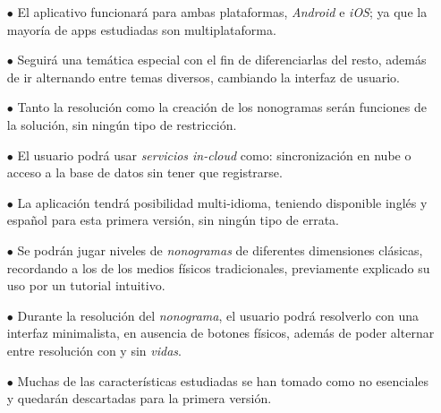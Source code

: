 \begin{itemize}
  \item[$\bullet$] El aplicativo funcionará para ambas plataformas, \textit{Android} e \textit{iOS}; ya que la mayoría de apps estudiadas son multiplataforma.
  \item[$\bullet$] Seguirá una temática especial con el fin de diferenciarlas del resto, además de ir alternando entre temas diversos, cambiando
  la interfaz de usuario.
  \item[$\bullet$] Tanto la resolución como la creación de los nonogramas serán funciones de la solución, sin ningún tipo de restricción.
  \item[$\bullet$] El usuario podrá usar \textit{servicios in-cloud} como: sincronización en nube o acceso a la base de datos sin tener que registrarse.
  \item[$\bullet$] La aplicación tendrá posibilidad multi-idioma, teniendo disponible inglés y español para esta primera versión, sin ningún tipo de errata.
  \item[$\bullet$] Se podrán jugar niveles de \textit{nonogramas} de diferentes dimensiones clásicas, recordando a los de los medios físicos tradicionales,
  previamente explicado su uso por un tutorial intuitivo. 
  \item[$\bullet$] Durante la resolución del \textit{nonograma}, el usuario podrá resolverlo con una interfaz minimalista, en ausencia de botones físicos,
  además de poder alternar entre resolución con y sin \textit{vidas}.
  \item[$\bullet$] Muchas de las características estudiadas se han tomado como no esenciales y quedarán descartadas para la primera versión.
\end{itemize}